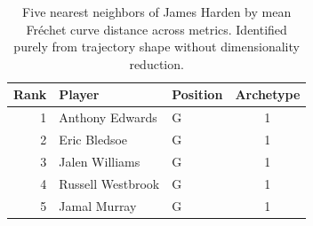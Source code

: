 \begin{table}[htbp]
  \centering\small
  \begin{tabular}{rllc}
    \toprule
    Rank & Player & Position & Archetype \\
    \midrule
    1 & Anthony Edwards & G & 1 \\
    2 & Eric Bledsoe & G & 1 \\
    3 & Jalen Williams & G & 1 \\
    4 & Russell Westbrook & G & 1 \\
    5 & Jamal Murray & G & 1 \\
    \bottomrule
  \end{tabular}
  \caption{Five nearest neighbors of James Harden by mean Fr\'{e}chet curve distance across metrics. Identified purely from trajectory shape without dimensionality reduction.}
  \label{tab:James_Harden_frechet_curve_neighbors}
\end{table}

